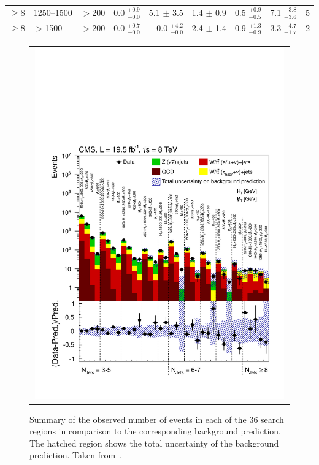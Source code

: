 \begin{table}[!hp]
{\begin{tabular}{lll|r|r|r|r|r|r}
      $\geq$8 & 1250--1500  & $>200$   &    0.0 $^{+0.9}_{-0.0}$       &    5.1 $\pm$    3.5      &   1.4 $\pm$    0.9      &  0.5 $^{+0.9}_{-0.5}$       & 7.1    $^{+3.8}_{-3.6}$    &     5  \\
      $\geq$8 & $>$1500    & $>200$   &    0.0 $^{+0.7}_{-0.0}$       &    0.0 $^{+4.2}_{-0.0}$      &   2.4 $\pm$    1.4      &  0.9 $^{+1.3}_{-0.9}$       & 3.3    $^{+4.7}_{-1.7}$    &     2  \\ \hline \hline


    \end{tabular}}
\end{table}
\begin{figure}[!hp]
  \centering
  \begin{tabular}{c}
    \includegraphics[width=0.99\textwidth]{figures/RA2_summary.pdf}
  \end{tabular}
  \caption{Summary of the observed number of events in each of the 36 search regions in comparison to the corresponding background prediction. The hatched region shows the total uncertainty of the background prediction. Taken from~\cite{Chatrchyan:2014lfa}.}
  \label{fig:ra2_summary}
\end{figure}
